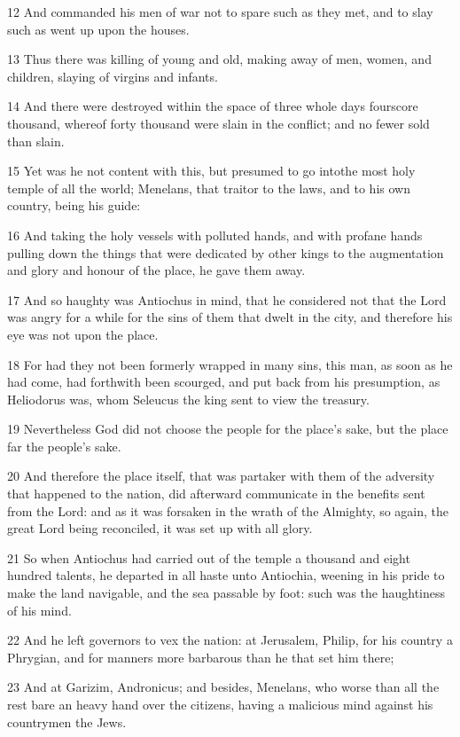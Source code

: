 \par 12 And commanded his men of war not to spare such as they met, and to slay such as went up upon the houses.
\par 13 Thus there was killing of young and old, making away of men, women, and children, slaying of virgins and infants.
\par 14 And there were destroyed within the space of three whole days fourscore thousand, whereof forty thousand were slain in the conflict; and no fewer sold than slain.
\par 15 Yet was he not content with this, but presumed to go intothe most holy temple of all the world; Menelans, that traitor to the laws, and to his own country, being his guide:
\par 16 And taking the holy vessels with polluted hands, and with profane hands pulling down the things that were dedicated by other kings to the augmentation and glory and honour of the place, he gave them away.
\par 17 And so haughty was Antiochus in mind, that he considered not that the Lord was angry for a while for the sins of them that dwelt in the city, and therefore his eye was not upon the place.
\par 18 For had they not been formerly wrapped in many sins, this man, as soon as he had come, had forthwith been scourged, and put back from his presumption, as Heliodorus was, whom Seleucus the king sent to view the treasury.
\par 19 Nevertheless God did not choose the people for the place's sake, but the place far the people's sake.
\par 20 And therefore the place itself, that was partaker with them of the adversity that happened to the nation, did afterward communicate in the benefits sent from the Lord: and as it was forsaken in the wrath of the Almighty, so again, the great Lord being reconciled, it was set up with all glory.
\par 21 So when Antiochus had carried out of the temple a thousand and eight hundred talents, he departed in all haste unto Antiochia, weening in his pride to make the land navigable, and the sea passable by foot: such was the haughtiness of his mind.
\par 22 And he left governors to vex the nation: at Jerusalem, Philip, for his country a Phrygian, and for manners more barbarous than he that set him there;
\par 23 And at Garizim, Andronicus; and besides, Menelans, who worse than all the rest bare an heavy hand over the citizens, having a malicious mind against his countrymen the Jews.
